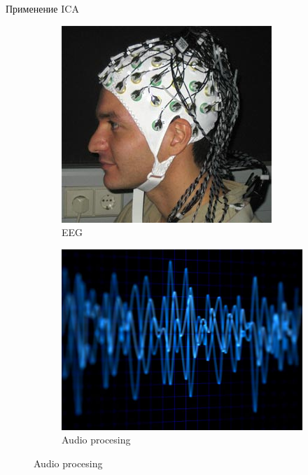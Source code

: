 \documentclass[10pt]{beamer}
\begin{document}
\begin{frame}{Применение ICA}
\begin{figure}
    \centering
    \begin{subfigure}[b]{0.4\textwidth}
        \includegraphics[width=\textwidth]{images/eeg123.jpg}
        \caption{EEG}
    \end{subfigure}
    \begin{subfigure}[b]{0.4\textwidth}
        \includegraphics[width=\textwidth]{images/audio.jpg}
        \caption{Audio procesing}
    \end{subfigure}


\end{figure}
\end{frame}
\end{document}
